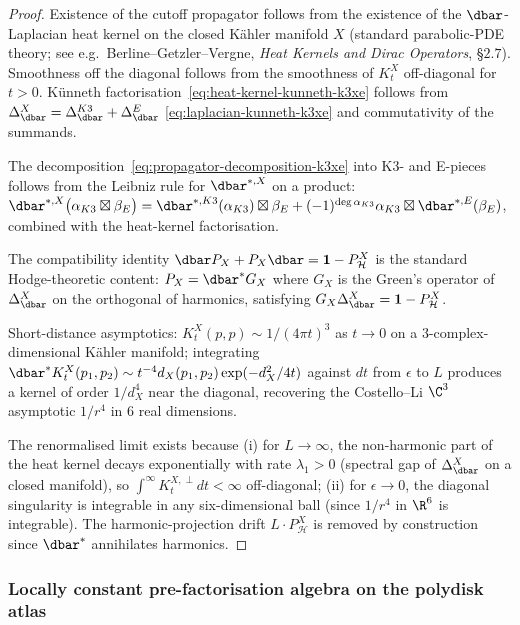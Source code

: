 \begin{proof}
Existence of the cutoff propagator follows from the existence of the
$\dbar$-Laplacian heat kernel on the closed K\"ahler manifold $X$
\textup{(}standard parabolic-PDE theory; see e.g.~Berline--Getzler--Vergne,
\emph{Heat Kernels and Dirac Operators}, \S$2.7$\textup{).} Smoothness
off the diagonal follows from the smoothness of $K_t^X$ off-diagonal
for $t > 0$. K\"unneth factorisation~\eqref{eq:heat-kernel-kunneth-k3xe}
follows from
$\Delta_{\dbar}^X = \Delta_{\dbar}^{K3} + \Delta_{\dbar}^E$
\eqref{eq:laplacian-kunneth-k3xe} and commutativity of the summands.

The decomposition~\eqref{eq:propagator-decomposition-k3xe} into K3- and
E-pieces follows from the Leibniz rule for $\dbar^{*, X}$ on a product:
$\dbar^{*, X}\bigl(\alpha_{K3} \boxtimes \beta_E\bigr)
 = \dbar^{*, K3}(\alpha_{K3}) \boxtimes \beta_E
 + (-1)^{\deg \alpha_{K3}} \alpha_{K3} \boxtimes \dbar^{*, E}(\beta_E)$,
combined with the heat-kernel factorisation.

The compatibility identity $\dbar P_X + P_X \dbar = \mathbf{1} - P_{\mathcal{H}}^X$
is the standard Hodge-theoretic content: $P_X = \dbar^{*} G_X$ where $G_X$
is the Green's operator of $\Delta_{\dbar}^X$ on the orthogonal of
harmonics, satisfying $G_X \Delta_{\dbar}^X = \mathbf{1} - P_{\mathcal{H}}^X$.

Short-distance asymptotics: $K_t^X(p, p) \sim 1/(4\pi t)^3$ as $t \to 0$
on a $3$-complex-dimensional K\"ahler manifold; integrating
$\dbar^{*} K_t^X(p_1, p_2) \sim t^{-4} d_X(p_1, p_2) \exp(-d_X^2/4t)$
against $dt$ from $\epsilon$ to $L$ produces a kernel of order
$1/d_X^4$ near the diagonal, recovering the Costello--Li
$\C^3$ asymptotic $1/r^4$ in $6$ real dimensions.

The renormalised limit exists because (i) for $L \to \infty$, the
non-harmonic part of the heat kernel decays exponentially with rate
$\lambda_1 > 0$ (spectral gap of $\Delta_{\dbar}^X$ on a closed
manifold), so $\int^\infty K_t^{X, \perp} dt < \infty$ off-diagonal;
(ii) for $\epsilon \to 0$, the diagonal singularity is integrable in any
six-dimensional ball (since $1/r^4$ in $\R^6$ is integrable). The
harmonic-projection drift $L \cdot P_{\mathcal{H}}^X$ is removed by
construction since $\dbar^{*}$ annihilates harmonics.
\end{proof}

\subsubsection{Locally constant pre-factorisation algebra on the polydisk atlas}
\label{subsubsec:pre-fa-polydisk-k3xe}

